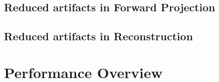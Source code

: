 \subsection{Reduced artifacts in Forward Projection}\label{sec:experiments_artifacts_forward}

\subsection{Reduced artifacts in Reconstruction}\label{sec:experiments_artifacts_reconstruction}

\section{Performance Overview}\label{sec:experiments_performance_projection}
